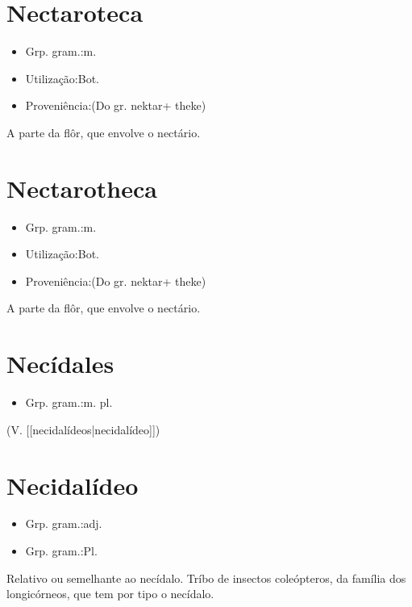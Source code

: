 \section{Nectaroteca}
\begin{itemize}
\item {Grp. gram.:m.}
\end{itemize}
\begin{itemize}
\item {Utilização:Bot.}
\end{itemize}
\begin{itemize}
\item {Proveniência:(Do gr. \textunderscore nektar\textunderscore  + \textunderscore theke\textunderscore )}
\end{itemize}
A parte da flôr, que envolve o nectário.
\section{Nectarotheca}
\begin{itemize}
\item {Grp. gram.:m.}
\end{itemize}
\begin{itemize}
\item {Utilização:Bot.}
\end{itemize}
\begin{itemize}
\item {Proveniência:(Do gr. \textunderscore nektar\textunderscore  + \textunderscore theke\textunderscore )}
\end{itemize}
A parte da flôr, que envolve o nectário.
\section{Necídales}
\begin{itemize}
\item {Grp. gram.:m. pl.}
\end{itemize}
(V. [[necidalídeos|necidalídeo]])
\section{Necidalídeo}
\begin{itemize}
\item {Grp. gram.:adj.}
\end{itemize}
\begin{itemize}
\item {Grp. gram.:Pl.}
\end{itemize}
Relativo ou semelhante ao necídalo.
Tríbo de insectos coleópteros, da família dos longicórneos, que tem por tipo o necídalo.
